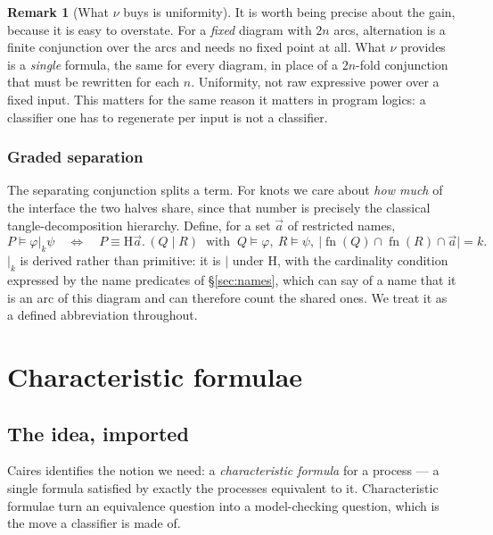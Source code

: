 \documentclass[11pt]{article}
\theoremstyle{definition}
\newtheorem{remark}{Remark}
\newcommand{\sep}{\mathbin{\vert}}
\newcommand{\ssep}[1]{\mathbin{\vert_{#1}}}
\newcommand{\Hq}{\mathrm{H}}
\newcommand{\fn}{\operatorname{fn}}
\begin{document}
\begin{remark}[What $\nu$ buys is uniformity]\label{rem:uniform}
It is worth being precise about the gain, because it is easy to overstate. For a
\emph{fixed} diagram with $2n$ arcs, alternation is a finite conjunction over the
arcs and needs no fixed point at all. What $\nu$ provides is a \emph{single}
formula, the same for every diagram, in place of a $2n$-fold conjunction that must
be rewritten for each $n$. Uniformity, not raw expressive power over a fixed
input. This matters for the same reason it matters in program logics: a
classifier one has to regenerate per input is not a classifier.
\end{remark}

\subsubsection{Graded separation}\label{sec:graded}

The separating conjunction splits a term. For knots we care about \emph{how much}
of the interface the two halves share, since that number is precisely the
classical tangle-decomposition hierarchy. Define, for a set $\vec a$ of restricted
names,
\[
P \models \varphi \ssep{k} \psi
\quad\Longleftrightarrow\quad
P \equiv \Hq \vec a.\,(Q \sep R)
\ \text{ with } \
Q \models \varphi,\ R \models \psi,\ \bigl|\fn(Q) \cap \fn(R) \cap \vec a\bigr| = k .
\]
$\ssep{k}$ is derived rather than primitive: it is $\sep$ under $\Hq$, with the
cardinality condition expressed by the name predicates of \S\ref{sec:names}, which
can say of a name that it is an arc of this diagram and can therefore count the
shared ones. We treat it as a defined abbreviation throughout.

\section{Characteristic formulae}\label{sec:chi}

\subsection{The idea, imported}\label{sec:caires}

Caires \cite{caires} identifies the notion we need: a \emph{characteristic
formula} for a process --- a single formula satisfied by exactly the processes
equivalent to it. Characteristic formulae turn an equivalence question into a
model-checking question, which is the move a classifier is made of.
\end{document}
